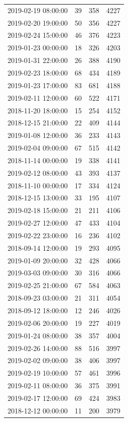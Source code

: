 \begin{tabular}{lrrr}
2019-02-19 08:00:00 & 39 & 358 & 4227 \\
2019-02-20 19:00:00 & 50 & 356 & 4227 \\
2019-02-24 15:00:00 & 46 & 376 & 4223 \\
2019-01-23 00:00:00 & 18 & 326 & 4203 \\
2019-01-31 22:00:00 & 26 & 388 & 4190 \\
2019-02-23 18:00:00 & 68 & 434 & 4189 \\
2019-01-23 17:00:00 & 83 & 681 & 4188 \\
2019-02-11 12:00:00 & 60 & 522 & 4171 \\
2018-11-20 18:00:00 & 15 & 254 & 4152 \\
2018-12-15 21:00:00 & 22 & 409 & 4144 \\
2019-01-08 12:00:00 & 36 & 233 & 4143 \\
2019-02-04 09:00:00 & 67 & 515 & 4142 \\
2018-11-14 00:00:00 & 19 & 338 & 4141 \\
2019-02-12 08:00:00 & 43 & 393 & 4137 \\
2018-11-10 00:00:00 & 17 & 334 & 4124 \\
2018-12-15 13:00:00 & 33 & 195 & 4107 \\
2019-02-18 15:00:00 & 21 & 211 & 4106 \\
2019-02-27 12:00:00 & 47 & 433 & 4104 \\
2019-02-22 23:00:00 & 16 & 236 & 4102 \\
2018-09-14 12:00:00 & 19 & 293 & 4095 \\
2019-01-09 20:00:00 & 32 & 428 & 4066 \\
2019-03-03 09:00:00 & 30 & 316 & 4066 \\
2019-02-25 21:00:00 & 67 & 584 & 4063 \\
2018-09-23 03:00:00 & 21 & 311 & 4054 \\
2018-09-12 18:00:00 & 12 & 246 & 4026 \\
2019-02-06 20:00:00 & 19 & 227 & 4019 \\
2019-01-24 08:00:00 & 38 & 357 & 4004 \\
2019-02-26 14:00:00 & 88 & 516 & 3997 \\
2019-02-02 09:00:00 & 38 & 406 & 3997 \\
2019-02-19 10:00:00 & 57 & 461 & 3996 \\
2019-02-11 08:00:00 & 36 & 375 & 3991 \\
2019-02-17 12:00:00 & 69 & 424 & 3983 \\
2018-12-12 00:00:00 & 11 & 200 & 3979 \\

\end{tabular}
